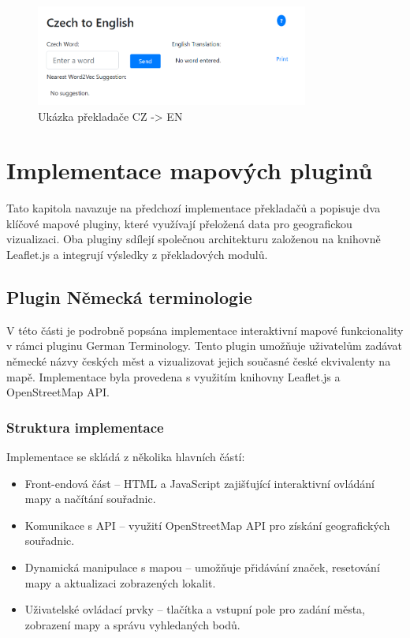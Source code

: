 \documentclass[czech, ba, kiv, he]{fasthesis}
\begin{document}
\begin{figure}[h]  
    \centering  
    \includegraphics[width=0.8\textwidth]{cz_en_translation.png}  
    \caption{Ukázka překladače CZ -> EN}  
\end{figure}

\section{Implementace mapových pluginů}

Tato kapitola navazuje na předchozí implementace překladačů a popisuje dva klíčové mapové pluginy, které využívají přeložená data pro geografickou vizualizaci. Oba pluginy sdílejí společnou architekturu založenou na knihovně Leaflet.js a integrují výsledky z překladových modulů.

\subsection{Plugin Německá terminologie}

V této části je podrobně popsána implementace interaktivní mapové funkcionality v rámci pluginu German Terminology. Tento plugin umožňuje uživatelům zadávat německé názvy českých měst a vizualizovat jejich současné české ekvivalenty na mapě. Implementace byla provedena s využitím knihovny Leaflet.js a OpenStreetMap API.

\subsubsection{Struktura implementace}

Implementace se skládá z několika hlavních částí:

\begin{itemize}
\item Front-endová část – HTML a JavaScript zajišťující interaktivní ovládání mapy a načítání souřadnic.
\item Komunikace s API – využití OpenStreetMap API pro získání geografických souřadnic.
\item Dynamická manipulace s mapou – umožňuje přidávání značek, resetování mapy a aktualizaci zobrazených lokalit.
\item Uživatelské ovládací prvky – tlačítka a vstupní pole pro zadání města, zobrazení mapy a správu vyhledaných bodů.
\end{itemize}
\end{document}
